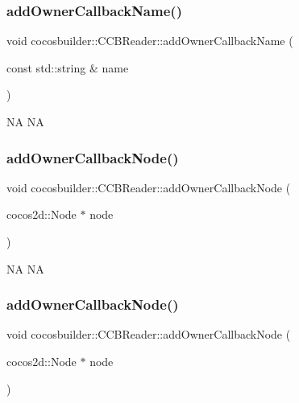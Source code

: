 \subsubsection{\texorpdfstring{add\+Owner\+Callback\+Name()}{addOwnerCallbackName()}\hspace{0.1cm}{\footnotesize\ttfamily [2/2]}}
{\footnotesize\ttfamily void cocosbuilder\+::\+C\+C\+B\+Reader\+::add\+Owner\+Callback\+Name (\begin{DoxyParamCaption}\item[{const std\+::string \&}]{name }\end{DoxyParamCaption})}

NA  NA \mbox{\label{classcocosbuilder_1_1CCBReader_ae49813165f657e67e08253b86478d17c}} 
\subsubsection{\texorpdfstring{add\+Owner\+Callback\+Node()}{addOwnerCallbackNode()}\hspace{0.1cm}{\footnotesize\ttfamily [1/2]}}
{\footnotesize\ttfamily void cocosbuilder\+::\+C\+C\+B\+Reader\+::add\+Owner\+Callback\+Node (\begin{DoxyParamCaption}\item[{cocos2d\+::\+Node $\ast$}]{node }\end{DoxyParamCaption})}

NA  NA \mbox{\label{classcocosbuilder_1_1CCBReader_ae49813165f657e67e08253b86478d17c}} 
\subsubsection{\texorpdfstring{add\+Owner\+Callback\+Node()}{addOwnerCallbackNode()}\hspace{0.1cm}{\footnotesize\ttfamily [2/2]}}
{\footnotesize\ttfamily void cocosbuilder\+::\+C\+C\+B\+Reader\+::add\+Owner\+Callback\+Node (\begin{DoxyParamCaption}\item[{cocos2d\+::\+Node $\ast$}]{node }\end{DoxyParamCaption})}

